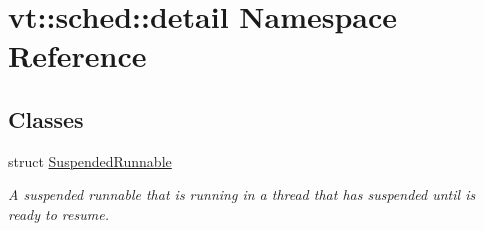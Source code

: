 \hypertarget{namespacevt_1_1sched_1_1detail}{}\section{vt\+:\+:sched\+:\+:detail Namespace Reference}
\label{namespacevt_1_1sched_1_1detail}
\subsection*{Classes}
\begin{DoxyCompactItemize}
\item 
struct \hyperlink{structvt_1_1sched_1_1detail_1_1_suspended_runnable}{Suspended\+Runnable}
\begin{DoxyCompactList}\small\item\em A suspended runnable that is running in a thread that has suspended until is ready to resume. \end{DoxyCompactList}\end{DoxyCompactItemize}
